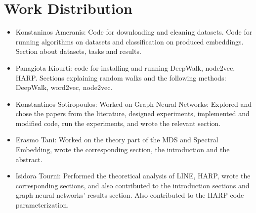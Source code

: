 \section{Work Distribution}
\begin{itemize}
\item Konstaninos Ameranis: Code for downloading and cleaning datasets. Code for running algorithms
on datasets and classification on produced embeddings. Section about datasets, tasks and
results.
\item Panagiota Kiourti: code for installing and running DeepWalk, node2vec, HARP. Sections explaining random walks and the following methods: DeepWalk, word2vec, 
node2vec.
\item Konstantinos Sotiropoulos: Worked on Graph Neural Networks: Explored and chose the papers from the literature, designed experiments, implemented and modified code, run the experiments, and wrote the relevant section. 
\item Erasmo Tani: Worked on the theory part of the MDS and Spectral Embedding, wrote the corresponding section, the introduction and the abstract.
\item Isidora Tourni: Performed the theoretical analysis of LINE, HARP, wrote the corresponding sections, and also contributed to the introduction sections and graph neural networks' results section. Also contributed to the HARP code parameterization.
\end{itemize}
